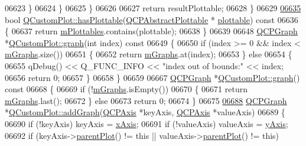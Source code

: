 \begin{DoxyCode}
06623       \}
06624     \}
06625   \}
06626   
06627   \textcolor{keywordflow}{return} resultPlottable;
06628 \}
06629 
\hypertarget{a00115_source_l06635}{}\hyperlink{a00116_a4fc28914e2ee91aab424b7ce46b6bdf1}{06635} \textcolor{keywordtype}{bool} \hyperlink{a00116_a4fc28914e2ee91aab424b7ce46b6bdf1}{QCustomPlot::hasPlottable}(\hyperlink{a00024}{QCPAbstractPlottable} *
      \hyperlink{a00116_a5c198d46ea2a2255a1b73e2c590f0364}{plottable})\textcolor{keyword}{ const}
06636 \textcolor{keyword}{}\{
06637   \textcolor{keywordflow}{return} \hyperlink{a00116_a57ed6eb2e0a767a8344de45110a3e81d}{mPlottables}.contains(plottable);
06638 \}
06639 
06648 \hyperlink{a00031}{QCPGraph} *\hyperlink{a00116_ac6b19830ab0f0073ff3089cf7c9b3c2e}{QCustomPlot::graph}(\textcolor{keywordtype}{int} index)\textcolor{keyword}{ const}
06649 \textcolor{keyword}{}\{
06650   \textcolor{keywordflow}{if} (index >= 0 && index < \hyperlink{a00116_a54ed2081d9366a6c2137bf9d9f7b8371}{mGraphs}.size())
06651   \{
06652     \textcolor{keywordflow}{return} \hyperlink{a00116_a54ed2081d9366a6c2137bf9d9f7b8371}{mGraphs}.at(index);
06653   \} \textcolor{keywordflow}{else}
06654   \{
06655     qDebug() << Q\_FUNC\_INFO << \textcolor{stringliteral}{"index out of bounds:"} << index;
06656     \textcolor{keywordflow}{return} 0;
06657   \}
06658 \}
06659 
06667 \hyperlink{a00031}{QCPGraph} *\hyperlink{a00116_ac6b19830ab0f0073ff3089cf7c9b3c2e}{QCustomPlot::graph}()\textcolor{keyword}{ const}
06668 \textcolor{keyword}{}\{
06669   \textcolor{keywordflow}{if} (!\hyperlink{a00116_a54ed2081d9366a6c2137bf9d9f7b8371}{mGraphs}.isEmpty())
06670   \{
06671     \textcolor{keywordflow}{return} \hyperlink{a00116_a54ed2081d9366a6c2137bf9d9f7b8371}{mGraphs}.last();
06672   \} \textcolor{keywordflow}{else}
06673     \textcolor{keywordflow}{return} 0;
06674 \}
06675 
\hypertarget{a00115_source_l06688}{}\hyperlink{a00116_a6fb2873d35a8a8089842d81a70a54167}{06688} \hyperlink{a00031}{QCPGraph} *\hyperlink{a00116_a6fb2873d35a8a8089842d81a70a54167}{QCustomPlot::addGraph}(\hyperlink{a00025}{QCPAxis} *keyAxis, 
      \hyperlink{a00025}{QCPAxis} *valueAxis)
06689 \{
06690   \textcolor{keywordflow}{if} (!keyAxis) keyAxis = \hyperlink{a00116_a384438707adbcc96b0fa1324106f7129}{xAxis};
06691   \textcolor{keywordflow}{if} (!valueAxis) valueAxis = \hyperlink{a00116_af168096ce67002b1fbce18ae5dd1b652}{yAxis};
06692   \textcolor{keywordflow}{if} (keyAxis->\hyperlink{a00044_ab7e0e94461566093d36ffc0f5312b109}{parentPlot}() != \textcolor{keyword}{this} || valueAxis->\hyperlink{a00044_ab7e0e94461566093d36ffc0f5312b109}{parentPlot}() != \textcolor{keyword}{this})

\end{DoxyCode}
